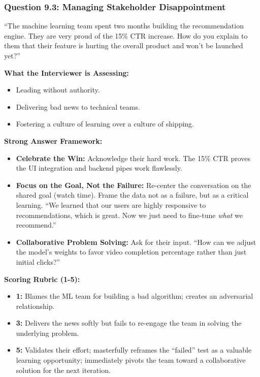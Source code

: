 \documentclass[
  11pt,
  openany,
  oneside]{book}
\providecommand{\tightlist}{%
  \setlength{\itemsep}{0pt}\setlength{\parskip}{0pt}}
\begin{document}
\subsubsection{Question 9.3: Managing Stakeholder
Disappointment}\label{question-9.3-managing-stakeholder-disappointment}

``The machine learning team spent two months building the recommendation
engine. They are very proud of the 15\% CTR increase. How do you explain
to them that their feature is hurting the overall product and won't be
launched yet?''

\textbf{What the Interviewer is Assessing:}

\begin{itemize}
\tightlist
\item
  Leading without authority.
\item
  Delivering bad news to technical teams.
\item
  Fostering a culture of learning over a culture of shipping.
\end{itemize}

\textbf{Strong Answer Framework:}

\begin{itemize}
\tightlist
\item
  \textbf{Celebrate the Win:} Acknowledge their hard work. The 15\% CTR
  proves the UI integration and backend pipes work flawlessly.
\item
  \textbf{Focus on the Goal, Not the Failure:} Re-center the
  conversation on the shared goal (watch time). Frame the data not as a
  failure, but as a critical learning. ``We learned that our users are
  highly responsive to recommendations, which is great. Now we just need
  to fine-tune \emph{what} we recommend.''
\item
  \textbf{Collaborative Problem Solving:} Ask for their input. ``How can
  we adjust the model's weights to favor video completion percentage
  rather than just initial clicks?''
\end{itemize}

\textbf{Scoring Rubric (1-5):}

\begin{itemize}
\tightlist
\item
  \textbf{1:} Blames the ML team for building a bad algorithm; creates
  an adversarial relationship.
\item
  \textbf{3:} Delivers the news softly but fails to re-engage the team
  in solving the underlying problem.
\item
  \textbf{5:} Validates their effort; masterfully reframes the
  ``failed'' test as a valuable learning opportunity; immediately pivots
  the team toward a collaborative solution for the next iteration.
\end{itemize}
\end{document}
